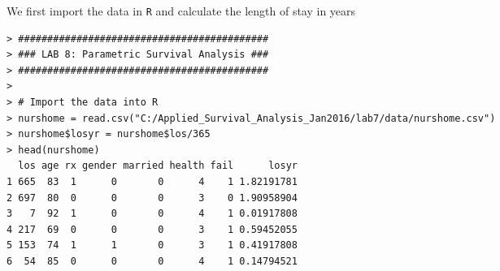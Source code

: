 We first import the data in \verb|R| and calculate the length of stay in years
\begin{spacing}{1.2}
\begin{footnotesize}
\begin{verbatim}
> ###########################################
> ### LAB 8: Parametric Survival Analysis ###
> ###########################################
> 
> # Import the data into R
> nurshome = read.csv("C:/Applied_Survival_Analysis_Jan2016/lab7/data/nurshome.csv")
> nurshome$losyr = nurshome$los/365
> head(nurshome)
  los age rx gender married health fail      losyr
1 665  83  1      0       0      4    1 1.82191781
2 697  80  0      0       0      3    0 1.90958904
3   7  92  1      0       0      4    1 0.01917808
4 217  69  0      0       0      3    1 0.59452055
5 153  74  1      1       0      3    1 0.41917808
6  54  85  0      0       0      4    1 0.14794521
\end{verbatim}
\end{footnotesize}
\end{spacing}
